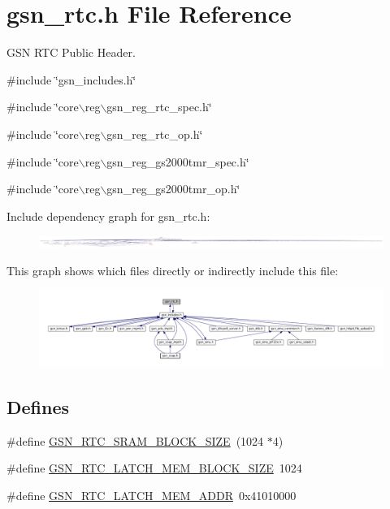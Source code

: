 \hypertarget{a00582}{
\section{gsn\_\-rtc.h File Reference}
\label{a00582}
}


GSN RTC Public Header.  


{\ttfamily \#include \char`\"{}gsn\_\-includes.h\char`\"{}}\par
{\ttfamily \#include \char`\"{}core$\backslash$reg$\backslash$gsn\_\-reg\_\-rtc\_\-spec.h\char`\"{}}\par
{\ttfamily \#include \char`\"{}core$\backslash$reg$\backslash$gsn\_\-reg\_\-rtc\_\-op.h\char`\"{}}\par
{\ttfamily \#include \char`\"{}core$\backslash$reg$\backslash$gsn\_\-reg\_\-gs2000tmr\_\-spec.h\char`\"{}}\par
{\ttfamily \#include \char`\"{}core$\backslash$reg$\backslash$gsn\_\-reg\_\-gs2000tmr\_\-op.h\char`\"{}}\par
Include dependency graph for gsn\_\-rtc.h:
\nopagebreak
\begin{figure}[H]
\begin{center}
\leavevmode
\includegraphics[width=400pt]{a00817}
\end{center}
\end{figure}
This graph shows which files directly or indirectly include this file:
\nopagebreak
\begin{figure}[H]
\begin{center}
\leavevmode
\includegraphics[width=400pt]{a00818}
\end{center}
\end{figure}
\subsection*{Defines}
\begin{DoxyCompactItemize}
\item 
\#define \hyperlink{a00582_ac30a46cb77d2c913ade1d5585bac19f5}{GSN\_\-RTC\_\-SRAM\_\-BLOCK\_\-SIZE}~(1024 $\ast$4)
\item 
\#define \hyperlink{a00582_a7372cd2c556667ff0089643241db715c}{GSN\_\-RTC\_\-LATCH\_\-MEM\_\-BLOCK\_\-SIZE}~1024
\item 
\#define \hyperlink{a00582_aa084e6874d928e77815dbe7381d6b97b}{GSN\_\-RTC\_\-LATCH\_\-MEM\_\-ADDR}~0x41010000
\end{DoxyCompactItemize}
